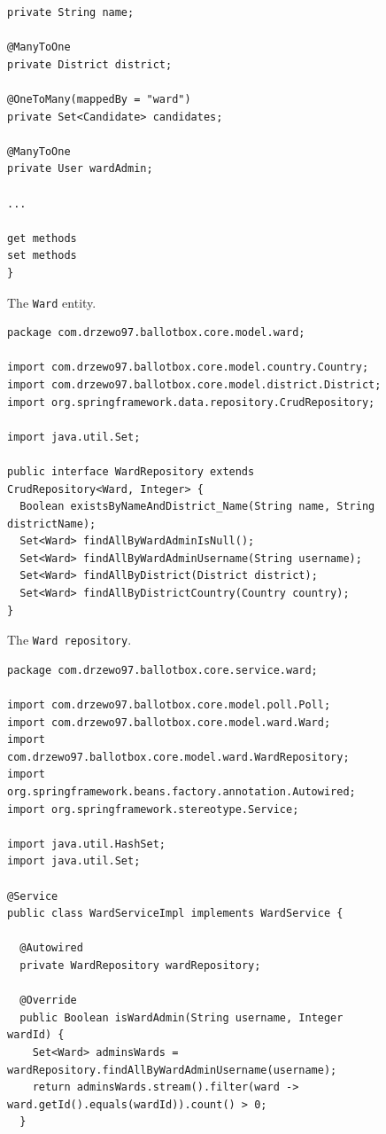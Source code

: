\documentclass[a4paper,twoside,12pt]{book}
\begin{document}
\begin{appendices}
\begin{figure}
\begin{lstlisting}
private String name;
          
@ManyToOne
private District district;
          
@OneToMany(mappedBy = "ward")
private Set<Candidate> candidates;
          
@ManyToOne
private User wardAdmin;

...

get methods
set methods
}
    \end{lstlisting}
    \caption{The \lstinline|Ward| entity.}
    \label{fig:ward_entity}
  \end{figure}

  \begin{figure}
    \centering
    \begin{lstlisting}
package com.drzewo97.ballotbox.core.model.ward;

import com.drzewo97.ballotbox.core.model.country.Country;
import com.drzewo97.ballotbox.core.model.district.District;
import org.springframework.data.repository.CrudRepository;
    
import java.util.Set;
    
public interface WardRepository extends CrudRepository<Ward, Integer> {
  Boolean existsByNameAndDistrict_Name(String name, String districtName);
  Set<Ward> findAllByWardAdminIsNull();
  Set<Ward> findAllByWardAdminUsername(String username);
  Set<Ward> findAllByDistrict(District district);
  Set<Ward> findAllByDistrictCountry(Country country);
}
    \end{lstlisting}
    \caption{The \lstinline|Ward repository|.}
    \label{fig:ward_repository}
  \end{figure}

  \begin{figure}
    \centering
    \begin{lstlisting}
package com.drzewo97.ballotbox.core.service.ward;

import com.drzewo97.ballotbox.core.model.poll.Poll;
import com.drzewo97.ballotbox.core.model.ward.Ward;
import com.drzewo97.ballotbox.core.model.ward.WardRepository;
import org.springframework.beans.factory.annotation.Autowired;
import org.springframework.stereotype.Service;
  
import java.util.HashSet;
import java.util.Set;
  
@Service
public class WardServiceImpl implements WardService {
    
  @Autowired
  private WardRepository wardRepository;
   
  @Override
  public Boolean isWardAdmin(String username, Integer wardId) {
    Set<Ward> adminsWards = wardRepository.findAllByWardAdminUsername(username);
    return adminsWards.stream().filter(ward -> ward.getId().equals(wardId)).count() > 0;
  }
    

\end{lstlisting}
\end{figure}
\end{appendices}
\end{document}
